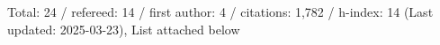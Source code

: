 Total: 24 / refereed: 14 / first author: 4 / citations: 1,782 / h-index: 14 (Last updated: 2025-03-23), List attached below